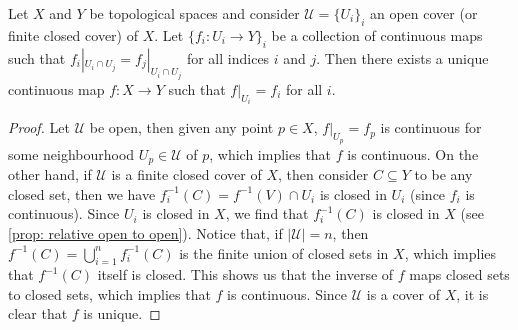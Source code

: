 \begin{lemma}[Gluing]
Let \(X\) and \(Y\) be topological spaces and consider
\(\mathcal U = \{U_i\}_i\) an open cover (or finite closed cover) of \(X\). Let
\(\{f_i: U_i \to Y\}_i\) be a collection of continuous maps such that
\(f_i|_{U_i \cap U_j} = f_j|_{U_i \cap U_j}\) for all indices \(i\) and
\(j\). Then there exists a unique continuous map \(f: X \to Y\) such that
\(f|_{U_i} = f_i\) for all \(i\).
\end{lemma}

\begin{proof}
Let \(\mathcal U\) be open, then given any point \(p \in X\), \(f|_{U_p} = f_p\)
is continuous for some neighbourhood \(U_p \in \mathcal U\) of \(p\), which
implies that \(f\) is continuous. On the other hand, if \(\mathcal U\) is a
finite closed cover of \(X\), then consider \(C \subseteq Y\) to be any closed
set, then we have \(f_i^{-1}(C) = f^{-1}(V) \cap U_i\) is closed in \(U_i\)
(since \(f_i\) is continuous). Since \(U_i\) is closed in \(X\), we find that
\(f_i^{-1}(C)\) is closed in \(X\) (see \cref{prop: relative open to open}).
Notice that, if \(|\mathcal U| = n\), then
\(f^{-1}(C) = \bigcup_{i=1}^n f_i^{-1}(C)\) is the finite union of closed sets
in \(X\), which implies that \(f^{-1}(C)\) itself is closed. This shows us that
the inverse of \(f\) maps closed sets to closed sets, which implies that \(f\)
is continuous.  Since \(\mathcal U\) is a cover of \(X\), it is clear that \(f\)
is unique.
\end{proof}

